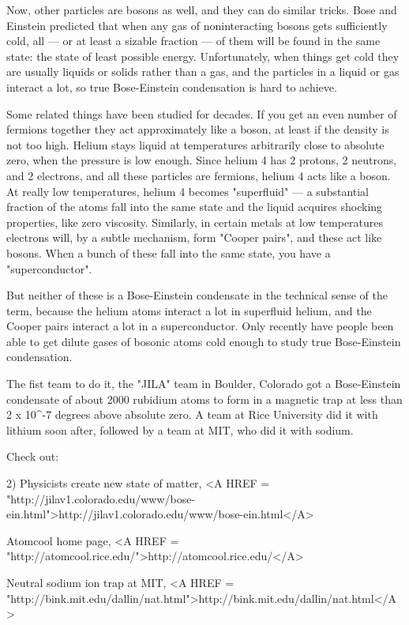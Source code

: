 Now, other particles are bosons as well, and they can do similar
tricks.  Bose and Einstein predicted that when any gas of
noninteracting bosons gets sufficiently cold, all --- or at least a
sizable fraction --- of them will be found in the same state: the
state of least possible energy.  Unfortunately, when things get cold
they are usually liquids or solids rather than a gas, and the
particles in a liquid or gas interact a lot, so true Bose-Einstein
condensation is hard to achieve.

Some related things have been studied for decades.  If you get an even
number of fermions together they act approximately like a boson, at
least if the density is not too high.  Helium stays liquid at
temperatures arbitrarily close to absolute zero, when the pressure is
low enough.  Since helium 4 has 2 protons, 2 neutrons, and 2
electrons, and all these particles are fermions, helium 4 acts like a
boson.  At really low temperatures, helium 4 becomes "superfluid" ---
a substantial fraction of the atoms fall into the same state and the
liquid acquires shocking properties, like zero viscosity.  Similarly,
in certain metals at low temperatures electrons will, by a subtle
mechanism, form "Cooper pairs", and these act like bosons.  When a
bunch of these fall into the same state, you have a "superconductor".

But neither of these is a Bose-Einstein condensate in the technical
sense of the term, because the helium atoms interact a lot in superfluid
helium, and the Cooper pairs interact a lot in a superconductor.
Only recently have people been able to get dilute gases of bosonic atoms
cold enough to study true Bose-Einstein condensation.  

The fist team to do it, the "JILA" team in Boulder, Colorado got a
Bose-Einstein condensate of about 2000 rubidium atoms to form in a
magnetic trap at less than 2 x 10^{-7} degrees above absolute zero.  A
team at Rice University did it with lithium soon after, followed by a
team at MIT, who did it with sodium.

Check out:

2) Physicists create new state of matter, <A HREF = "http://jilav1.colorado.edu/www/bose-ein.html">http://jilav1.colorado.edu/www/bose-ein.html</A>

Atomcool home page, <A HREF = "http://atomcool.rice.edu/">http://atomcool.rice.edu/</A>

Neutral sodium ion trap at MIT, <A HREF = "http://bink.mit.edu/dallin/nat.html">http://bink.mit.edu/dallin/nat.html</A>

